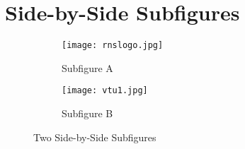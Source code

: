 \documentclass{article}
\begin{document}
\section{Side-by-Side Subfigures}
\begin{figure}[htbp]
\centering
\begin{subfigure}[b]{0.4\textwidth}
\centering
\texttt{[image: rnslogo.jpg]} %
\caption{Subfigure A}
\label{fig:subfig-a}
\end{subfigure}
\hfill
\begin{subfigure}[b]{0.4\textwidth}
\centering
\texttt{[image: vtu1.jpg]} %
\caption{Subfigure B}
\label{fig:subfig-b}
\end{subfigure}
\caption{Two Side-by-Side Subfigures}
\label{fig:side-by-side}
\end{figure}
\end{document}
